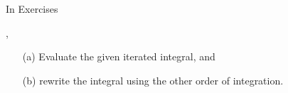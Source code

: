 {\noindent In Exercises}
{, 
\begin{enumerate}
\item [(a)] Evaluate the given iterated integral, and
\item [(b)] rewrite the integral using the other order of integration.
\end{enumerate}
}
